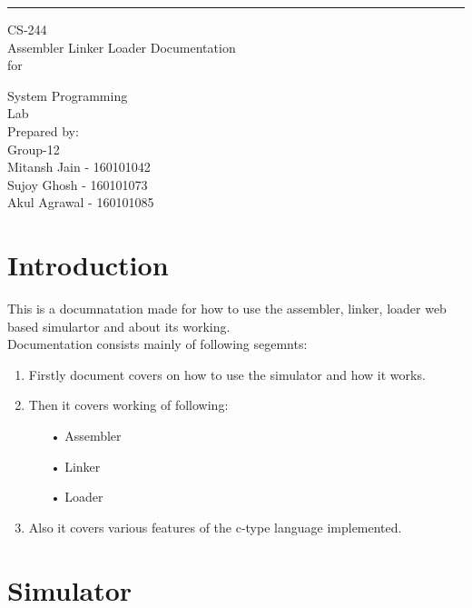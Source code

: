 \documentclass{scrreprt}
\date{}
\title{}
\begin{document}
\begin{flushright}
    \rule{16cm}{5pt}\vskip1cm
    \begin{bfseries}
        \Huge{CS-244\\Assembler Linker Loader Documentation}\\
        \vspace{1.5cm}
        for\\
       
        \vspace{1.5cm}
        
         System Programming\\
        Lab\\
        \vspace{1.9cm}
        \LARGE{Prepared by: }\\
        Group-12\\
        Mitansh Jain - 160101042\\
        Sujoy Ghosh - 160101073\\
        Akul Agrawal - 160101085\\
        \vspace{1.9cm}
    \end{bfseries}
\end{flushright}
\tableofcontents
\listoffigures
\listoftables

\chapter{Introduction}
This is a documnatation made for how to use the assembler, linker, loader web based simulartor and about its working.\\
Documentation consists mainly of following segemnts:
\begin{enumerate}
\item Firstly document covers on how to use the simulator and how it works.
\item Then it covers working of following:
\begin{itemize}
\item[•] Assembler
\item[•] Linker
\item[•] Loader
\end{itemize}
\item Also it covers various features of the c-type language implemented.
\end{enumerate}

\chapter{Simulator}
\end{document}
